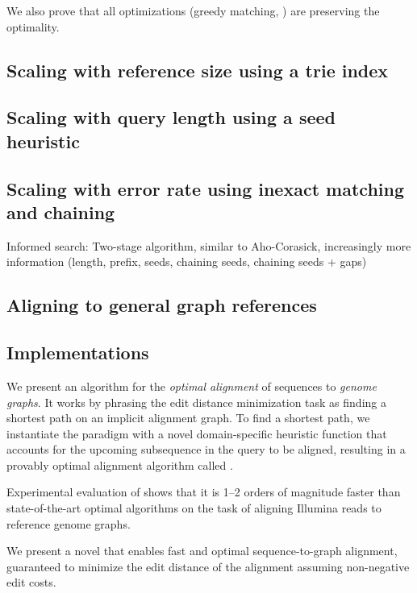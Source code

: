 We also prove that all optimizations (greedy matching, ) are preserving the optimality.

\subsection*{Scaling with reference size using a trie index}




\subsection*{Scaling with query length using a seed heuristic}

\subsection*{Scaling with error rate using inexact matching and chaining}

Informed search: Two-stage algorithm, similar to Aho-Corasick, increasingly more information (length, prefix, seeds, chaining seeds, chaining seeds + gaps)

\subsection*{Aligning to general graph references}

\subsection*{Implementations}

	
We present an algorithm for the \emph{optimal alignment} of sequences to
\emph{genome graphs}. It works by phrasing the edit distance minimization
task as finding a shortest path on an implicit alignment graph. To find a
shortest path, we instantiate the \A paradigm with a novel domain-specific
heuristic function that accounts for the upcoming subsequence in the query
to be aligned, resulting in a provably optimal alignment algorithm called
\astarix.

Experimental evaluation of \astarix shows that it is 1--2 orders of magnitude
faster than state-of-the-art optimal algorithms on the task of aligning Illumina
reads to reference genome graphs.

We present a novel \A \emph{\seedh} that enables fast and optimal
sequence-to-graph alignment, guaranteed to minimize the edit distance of the
alignment assuming non-negative edit costs.

